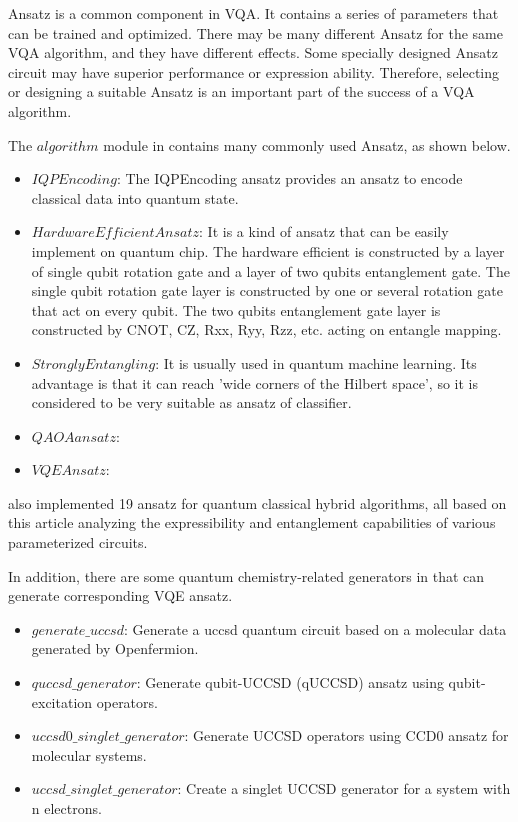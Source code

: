 Ansatz is a common component in VQA. It contains a series of parameters that can be trained and optimized. There may be many different Ansatz for the same VQA algorithm, and they have different effects. Some specially designed Ansatz circuit may have superior performance or expression ability. Therefore, selecting or designing a suitable Ansatz is an important part of the success of a VQA algorithm.

The $algorithm$ module in \MindQuantum contains many commonly used Ansatz, as shown below.

\begin{itemize}
    \item $IQPEncoding$: The IQPEncoding ansatz provides an ansatz to encode classical data into quantum state.

    \item $HardwareEfficientAnsatz$: It is a kind of ansatz that can be easily implement on quantum chip. The hardware efficient is constructed by a layer of single qubit rotation gate and a layer of two qubits entanglement gate. The single qubit rotation gate layer is constructed by one or several rotation gate that act on every qubit. The two qubits entanglement gate layer is constructed by CNOT, CZ, Rxx, Ryy, Rzz, etc. acting on entangle mapping.

    \item $StronglyEntangling$: It is usually used in quantum machine learning. Its advantage is that it can reach 'wide
          corners of the Hilbert space'\cite{Schuld_2020}, so it is considered to be very suitable as ansatz of classifier.

    \item $QAOA ansatz$:
    \item $VQE Ansatz$:
\end{itemize}

\MindQuantum also implemented 19 ansatz for quantum classical hybrid algorithms, all based on this article analyzing the expressibility and entanglement capabilities of various parameterized circuits.\cite{Sim_2019}

In addition, there are some quantum chemistry-related generators in \MindQuantum that can generate corresponding VQE ansatz.

\begin{itemize}
    \item $generate\_uccsd$: Generate a uccsd quantum circuit based on a molecular data generated by Openfermion.
    \item $quccsd\_generator$: Generate qubit-UCCSD (qUCCSD) ansatz using qubit-excitation operators.
    \item $uccsd0\_singlet\_generator$: Generate UCCSD operators using CCD0 ansatz for molecular systems.
    \item $uccsd\_singlet\_generator$: Create a singlet UCCSD generator for a system with n electrons.
\end{itemize}


